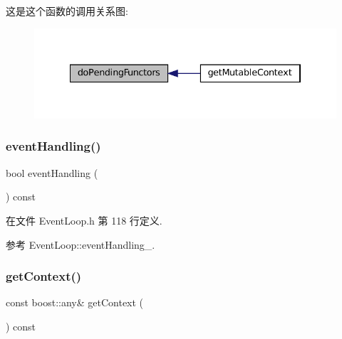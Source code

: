 这是这个函数的调用关系图\+:
\nopagebreak
\begin{figure}[H]
\begin{center}
\leavevmode
\includegraphics[width=334pt]{classmuduo_1_1net_1_1EventLoop_a52b9d01f6df5ea016514b924abda1299_icgraph}
\end{center}
\end{figure}
\mbox{\label{classmuduo_1_1net_1_1EventLoop_a54ddf02c262bfa4478b8fe33f62e2c7e}} 
\subsubsection{\texorpdfstring{event\+Handling()}{eventHandling()}}
{\footnotesize\ttfamily bool event\+Handling (\begin{DoxyParamCaption}{ }\end{DoxyParamCaption}) const\hspace{0.3cm}{\ttfamily [inline]}}



在文件 Event\+Loop.\+h 第 118 行定义.



参考 Event\+Loop\+::event\+Handling\+\_\+.

\mbox{\label{classmuduo_1_1net_1_1EventLoop_aa6a547152bf0e64f8e18dc7146094e1f}} 
\subsubsection{\texorpdfstring{get\+Context()}{getContext()}}
{\footnotesize\ttfamily const boost\+::any\& get\+Context (\begin{DoxyParamCaption}{ }\end{DoxyParamCaption}) const\hspace{0.3cm}{\ttfamily [inline]}}



